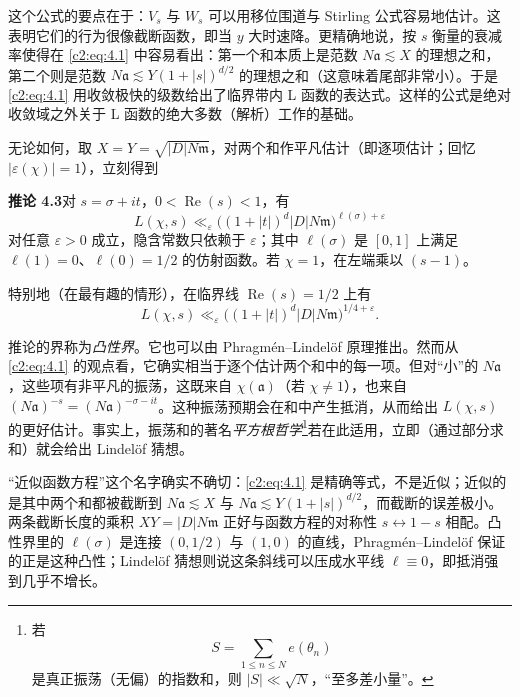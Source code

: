 这个公式的要点在于：$V_s$ 与 $W_s$ 可以用移位围道与 Stirling 公式容易地估计。这表明它们的行为很像截断函数，即当 $y$ 大时速降。更精确地说，按 $s$ 衡量的衰减率使得在 \eqref{c2:eq:4.1} 中容易看出：第一个和本质上是范数 $N\mathfrak{a}\lesssim X$ 的理想之和，第二个则是范数 $N\mathfrak{a}\lesssim Y(1+|s|)^{d/2}$ 的理想之和（这意味着尾部非常小）。于是 \eqref{c2:eq:4.1} 用收敛极快的级数给出了临界带内 L 函数的表达式。这样的公式是绝对收敛域之外关于 L 函数的绝大多数（解析）工作的基础。

无论如何，取 $X=Y=\sqrt{|D|N\mathfrak{m}}$，对两个和作平凡估计（即逐项估计；回忆 $|\varepsilon(\chi)|=1$），立刻得到

\par\medskip\noindent\textbf{推论 4.3}\quad 对 $s=\sigma+it$，$0<\operatorname{Re}(s)<1$，有
\[
L(\chi,s)\ll_\varepsilon\bigl((1+|t|)^d|D|N\mathfrak{m}\bigr)^{\ell(\sigma)+\varepsilon}
\]
对任意 $\varepsilon>0$ 成立，隐含常数只依赖于 $\varepsilon$；其中 $\ell(\sigma)$ 是 $[0,1]$ 上满足 $\ell(1)=0$、$\ell(0)=1/2$ 的仿射函数。若 $\chi=1$，在左端乘以 $(s-1)$。

特别地（在最有趣的情形），在临界线 $\operatorname{Re}(s)=1/2$ 上有
\[
L(\chi,s)\ll_\varepsilon\bigl((1+|t|)^d|D|N\mathfrak{m}\bigr)^{1/4+\varepsilon}.
\]

推论的界称为\emph{凸性界}。它也可以由 Phragmén--Lindelöf 原理推出。然而从 \eqref{c2:eq:4.1} 的观点看，它确实相当于逐个估计两个和中的每一项。但对“小”的 $N\mathfrak{a}$，这些项有非平凡的振荡，这既来自 $\chi(\mathfrak{a})$（若 $\chi\neq1$），也来自 $(N\mathfrak{a})^{-s}=(N\mathfrak{a})^{-\sigma-it}$。这种振荡预期会在和中产生抵消，从而给出 $L(\chi,s)$ 的更好估计。事实上，振荡和的著名\emph{平方根哲学}\footnote{若
\[
S=\sum_{1\le n\le N}e(\theta_n)
\]
是真正振荡（无偏）的指数和，则 $|S|\ll\sqrt{N}$，“至多差小量”。}若在此适用，立即（通过部分求和）就会给出 Lindelöf 猜想。

\begin{annote}
“近似函数方程”这个名字确实不确切：\eqref{c2:eq:4.1} 是精确等式，不是近似；近似的是其中两个和都被截断到 $N\mathfrak{a}\lesssim X$ 与 $N\mathfrak{a}\lesssim Y(1+|s|)^{d/2}$，而截断的误差极小。两条截断长度的乘积 $XY=|D|N\mathfrak{m}$ 正好与函数方程的对称性 $s\leftrightarrow1-s$ 相配。凸性界里的 $\ell(\sigma)$ 是连接 $(0,1/2)$ 与 $(1,0)$ 的直线，Phragmén--Lindelöf 保证的正是这种凸性；Lindelöf 猜想则说这条斜线可以压成水平线 $\ell\equiv0$，即抵消强到几乎不增长。
\par\vspace{0.15em}{\raggedleft 【来源：Titchmarsh 前引书近似函数方程与 Lindelöf 猜想各章（A）；Iwaniec--Kowalski 前引书相应部分（A）】\par}
\end{annote}

